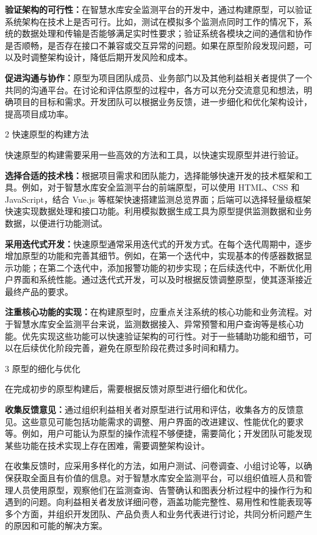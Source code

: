 \textbf{验证架构的可行性：}在智慧水库安全监测平台的开发中，通过构建原型，可以验证系统架构在技术上是否可行。比如，测试在模拟多个监测点同时工作的情况下，系统的数据处理和传输是否能够满足实时性要求；验证系统各模块之间的通信和协作是否顺畅，是否存在接口不兼容或交互异常的问题。如果在原型阶段发现问题，可以及时调整架构设计，降低后期开发风险和成本。

\textbf{促进沟通与协作：}原型为项目团队成员、业务部门以及其他利益相关者提供了一个共同的沟通平台。在讨论和评估原型的过程中，各方可以充分交流意见和想法，明确项目的目标和需求。开发团队可以根据业务反馈，进一步细化和优化架构设计，提高项目成功率。

2 快速原型的构建方法

快速原型的构建需要采用一些高效的方法和工具，以快速实现原型并进行验证。

\textbf{选择合适的技术栈：}根据项目需求和团队能力，选择能够快速开发的技术框架和工具。例如，对于智慧水库安全监测平台的前端原型，可以使用 HTML、CSS 和 JavaScript，结合 Vue.js 等框架快速搭建监测总览界面；后端可以选择轻量级框架快速实现数据处理和接口功能。利用模拟数据生成工具为原型提供监测数据和业务数据，以便进行功能测试。

\textbf{采用迭代式开发：}快速原型通常采用迭代式的开发方式。在每个迭代周期中，逐步增加原型的功能和完善其细节。例如，在第一个迭代中，实现基本的传感器数据显示功能；在第二个迭代中，添加报警功能的初步实现；在后续迭代中，不断优化用户界面和系统性能。通过迭代式开发，可以及时根据反馈调整原型，使其逐渐接近最终产品的要求。

\textbf{注重核心功能的实现：}在构建原型时，应重点关注系统的核心功能和业务流程。对于智慧水库安全监测平台来说，监测数据接入、异常预警和用户查询等是核心功能。优先实现这些功能可以快速验证架构的可行性。对于一些辅助功能和细节，可以在后续优化阶段完善，避免在原型阶段花费过多时间和精力。

3 原型的细化与优化

在完成初步的原型构建后，需要根据反馈对原型进行细化和优化。

\textbf{收集反馈意见：}通过组织利益相关者对原型进行试用和评估，收集各方的反馈意见。这些意见可能包括功能需求的调整、用户界面的改进建议、性能优化的要求等。例如，用户可能认为原型的操作流程不够便捷，需要简化；开发团队可能发现某些功能在技术实现上存在困难，需要调整架构设计。

在收集反馈时，应采用多样化的方法，如用户测试、问卷调查、小组讨论等，以确保获取全面且有价值的信息。对于智慧水库安全监测平台，可以组织值班人员和管理人员使用原型，观察他们在监测查询、告警确认和图表分析过程中的操作行为和遇到的问题。向利益相关者发放详细问卷，涵盖功能完整性、易用性和性能表现等多个方面，并组织开发团队、产品负责人和业务代表进行讨论，共同分析问题产生的原因和可能的解决方案。

